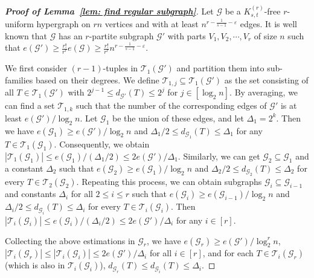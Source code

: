 \documentclass[11pt]{article}
\begin{document}
\begin{proof}[\bf Proof of Lemma~\ref{lem: find regular subgraph}]
Let $\mathcal G$ be a $K_{s,t}^{(r)}$-free $r$-uniform hypergraph on $rn$ vertices and with at least $n^{r-\frac{1}{s-1}- \varepsilon}$ edges.
It is well known that $\mathcal G$ has an $r$-partite subgraph $\mathcal G'$ with parts $V_1,V_2,\cdots, V_r$ of size $n$
such that $e(\mathcal G')\ge \frac{r!}{r^r}e(\mathcal G)\geq \frac{r!}{r^r}n^{r-\frac{1}{s-1}- \varepsilon}$.

We first consider $(r-1)$-tuples in $\mathcal T_1(\mathcal G')$ and partition them into sub-families based on their degrees.
We define $\mathcal T_{1,j}\subseteq \mathcal T_1(\mathcal G')$ as the set consisting of all $T\in \mathcal T_1(\mathcal G')$ with $2^{j-1}\le d_{\mathcal G'}(T)\le 2^{j}$ for $j\in [\log_2n]$.
By averaging, we can find a set $\mathcal T_{1,k}$ such that the number of the corresponding edges of $\mathcal G'$ is at least $e(\mathcal G')/\log_2n$.
Let $\mathcal G_1$ be the union of these edges, and let $\Delta_1 = 2^k$.
Then we have $e(\mathcal G_1)\ge e(\mathcal G')/\log_2n$ and $\Delta_1/2\le d_{\mathcal G_1}(T)\le \Delta_1$ for any $T\in \mathcal{T}_1(\mathcal{G}_1)$.
Consequently, we obtain $|\mathcal T_1(\mathcal G_1)|\le e(\mathcal G_1)/(\Delta_1/2)\le   2e(\mathcal G')/ \Delta_1 $.
Similarly, we can get $\mathcal G_2\subseteq \mathcal G_1$ and a constant $\Delta_2$ such that $e(\mathcal G_2)\ge e(\mathcal G_1)/\log_2n$ and $\Delta_2/2\le d_{\mathcal G_2}(T)\le \Delta_2$ for every $T\in \mathcal T_2(\mathcal G_2)$.
Repeating this process, we can obtain subgraphs $\mathcal G_i\subseteq \mathcal G_{i-1}$ and constants $\Delta_i$ for all $2\leq i\leq r$
such that $e(\mathcal G_i)\ge e(\mathcal G_{i-1})/\log_2n$ and $\Delta_i/2\le d_{\mathcal G_i}(T)\le \Delta_i$ for every $T\in \mathcal T_i(\mathcal G_i)$.
Then $|\mathcal T_i(\mathcal G_i)|\le e(\mathcal G_i)/(\Delta_i/2)\le 2e(\mathcal G')/ \Delta_i$ for any $i\in [r]$.

Collecting the above estimations in $\mathcal G_r$, we have $e(\mathcal G_r)\ge e(\mathcal G')/\log_2^rn$,
$|\mathcal T_i(\mathcal G_r)|\le |\mathcal T_i(\mathcal G_i)|\leq 2e(\mathcal G')/ \Delta_i$ for all $i\in [r]$,
and for each $T\in \mathcal T_i(\mathcal G_r)$ (which is also in $\mathcal T_i(\mathcal G_i)$),
$d_{\mathcal G_r}(T)\le d_{\mathcal G_i}(T)\leq \Delta_i$.




\end{proof}
\end{document}
